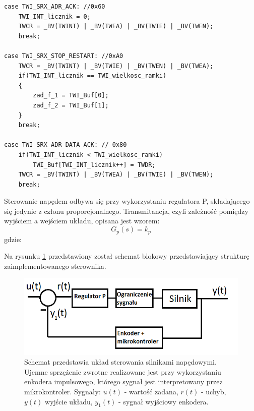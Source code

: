 \begin{lstlisting}
case TWI_SRX_ADR_ACK: //0x60
	TWI_INT_licznik = 0;
	TWCR = _BV(TWINT) | _BV(TWEA) | _BV(TWIE) | _BV(TWEN);
	break;
	
case TWI_SRX_STOP_RESTART: //0xA0
	TWCR = _BV(TWINT) | _BV(TWIE) | _BV(TWEN) | _BV(TWEA);
	if(TWI_INT_licznik == TWI_wielkosc_ramki)
	{
		zad_f_1 = TWI_Buf[0];
		zad_f_2 = TWI_Buf[1];
	}
	break;

case TWI_SRX_ADR_DATA_ACK: // 0x80
	if(TWI_INT_licznik < TWI_wielkosc_ramki)
		TWI_Buf[TWI_INT_licznik++] = TWDR;
	TWCR = _BV(TWINT) | _BV(TWEA) | _BV(TWIE) | _BV(TWEN);
	break;
\end{lstlisting}

Sterowanie napędem odbywa się przy wykorzystaniu regulatora P, składającego się jedynie z członu proporcjonalnego. Transmitancja, czyli zależność pomiędzy wyjściem a wejściem układu, opisana jest wzorem:
\begin{equation}
	G_{p}(s) =  k_p 
   \label{eq:reg}
 \end{equation}
 gdzie:  
 \begin{equationDescriptor}
 \end{equationDescriptor}
 \noindent
 Na rysunku \ref{schem_ster_2} przedstawiony został schemat blokowy przedstawiający strukturę zaimplementowanego sterownika.
   \begin{figure}[H]
    \begin{center}
      \includegraphics[scale=0.45]{imgs/sterowanie2.png}
 	\caption[Schemat zrealizowanego sterownika.]{\small{Schemat przedstawia układ sterowania silnikami napędowymi. Ujemne sprzężenie zwrotne realizowane jest przy wykorzystaniu enkodera impulsowego, którego sygnał jest interpretowany przez mikrokontroler. Sygnały: $u(t)$ - wartość zadana, $r(t)$ - uchyb, $y(t)$ wyjście układu, $y_1(t)$ - sygnał wyjściowy enkodera.}}
	\label{schem_ster_2}
    \end{center}
  \end{figure}  

